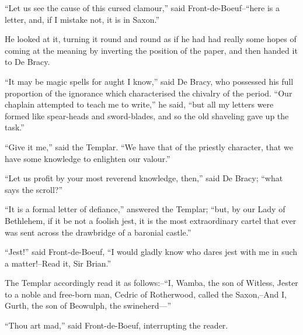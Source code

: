 ``Let us see the cause of this cursed clamour,'' said
Front-de-Boeuf--``here is a letter, and, if I mistake not, it is in
Saxon.''

He looked at it, turning it round and round as if he had had really some
hopes of coming at the meaning by inverting the position of the paper,
and then handed it to De Bracy.

``It may be magic spells for aught I know,'' said De Bracy, who
possessed his full proportion of the ignorance which characterised the
chivalry of the period. ``Our chaplain attempted to teach me to write,''
he said, ``but all my letters were formed like spear-heads and
sword-blades, and so the old shaveling gave up the task.''

``Give it me,'' said the Templar. ``We have that of the priestly
character, that we have some knowledge to enlighten our valour.''

``Let us profit by your most reverend knowledge, then,'' said De Bracy;
``what says the scroll?''

``It is a formal letter of defiance,'' answered the Templar; ``but, by
our Lady of Bethlehem, if it be not a foolish jest, it is the most
extraordinary cartel that ever was sent across the drawbridge of a
baronial castle.''

``Jest!'' said Front-de-Boeuf, ``I would gladly know who dares jest with
me in such a matter!--Read it, Sir Brian.''

The Templar accordingly read it as follows:--``I, Wamba, the son of
Witless, Jester to a noble and free-born man, Cedric of Rotherwood,
called the Saxon,--And I, Gurth, the son of Beowulph, the swineherd---''

``Thou art mad,'' said Front-de-Boeuf, interrupting the reader.

